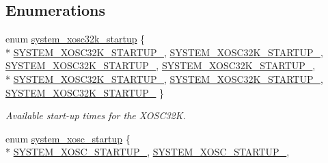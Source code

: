 \subsection*{Enumerations}
\begin{DoxyCompactItemize}
\item 
enum \hyperlink{group__asfdoc__sam0__system__clock__group_ga6a5226fe65f283da094a3d1bd6c5692f}{system\+\_\+xosc32k\+\_\+startup} \{ \\*
\hyperlink{group__asfdoc__sam0__system__clock__group_gga6a5226fe65f283da094a3d1bd6c5692fafa1cf29c3c5c3f74d1a2ffdd7c3199e3}{S\+Y\+S\+T\+E\+M\+\_\+\+X\+O\+S\+C32\+K\+\_\+\+S\+T\+A\+R\+T\+U\+P\+\_}, 
\hyperlink{group__asfdoc__sam0__system__clock__group_gga6a5226fe65f283da094a3d1bd6c5692fa6c5f69164630ba16faa100873bd73dc0}{S\+Y\+S\+T\+E\+M\+\_\+\+X\+O\+S\+C32\+K\+\_\+\+S\+T\+A\+R\+T\+U\+P\+\_}, 
\hyperlink{group__asfdoc__sam0__system__clock__group_gga6a5226fe65f283da094a3d1bd6c5692fae9d3c139f5442c2ba949a8d04ee7d38e}{S\+Y\+S\+T\+E\+M\+\_\+\+X\+O\+S\+C32\+K\+\_\+\+S\+T\+A\+R\+T\+U\+P\+\_}, 
\hyperlink{group__asfdoc__sam0__system__clock__group_gga6a5226fe65f283da094a3d1bd6c5692fa78dab161af7b89436e8efde14b12b087}{S\+Y\+S\+T\+E\+M\+\_\+\+X\+O\+S\+C32\+K\+\_\+\+S\+T\+A\+R\+T\+U\+P\+\_}, 
\\*
\hyperlink{group__asfdoc__sam0__system__clock__group_gga6a5226fe65f283da094a3d1bd6c5692fa7205636a0c4b4d7bc1b1aad12aaf9a49}{S\+Y\+S\+T\+E\+M\+\_\+\+X\+O\+S\+C32\+K\+\_\+\+S\+T\+A\+R\+T\+U\+P\+\_}, 
\hyperlink{group__asfdoc__sam0__system__clock__group_gga6a5226fe65f283da094a3d1bd6c5692fab44c3b77e6d8a8e49a1ed5b474eca9c2}{S\+Y\+S\+T\+E\+M\+\_\+\+X\+O\+S\+C32\+K\+\_\+\+S\+T\+A\+R\+T\+U\+P\+\_}, 
\hyperlink{group__asfdoc__sam0__system__clock__group_gga6a5226fe65f283da094a3d1bd6c5692fadf76c161a74f4e6ade8776338290c420}{S\+Y\+S\+T\+E\+M\+\_\+\+X\+O\+S\+C32\+K\+\_\+\+S\+T\+A\+R\+T\+U\+P\+\_}
 \}
\begin{DoxyCompactList}\small\item\em Available start-\/up times for the X\+O\+S\+C32\+K. \end{DoxyCompactList}\item 
enum \hyperlink{group__asfdoc__sam0__system__clock__group_ga93797ad2901b27dd84fa8b7edc9bb5c5}{system\+\_\+xosc\+\_\+startup} \{ \\*
\hyperlink{group__asfdoc__sam0__system__clock__group_gga93797ad2901b27dd84fa8b7edc9bb5c5a227f4495c112940e43509578037632ee}{S\+Y\+S\+T\+E\+M\+\_\+\+X\+O\+S\+C\+\_\+\+S\+T\+A\+R\+T\+U\+P\+\_}, 
\hyperlink{group__asfdoc__sam0__system__clock__group_gga93797ad2901b27dd84fa8b7edc9bb5c5adf5e2fc400d091e4cbee763fbde41555}{S\+Y\+S\+T\+E\+M\+\_\+\+X\+O\+S\+C\+\_\+\+S\+T\+A\+R\+T\+U\+P\+\_}, 

\end{DoxyCompactItemize}
